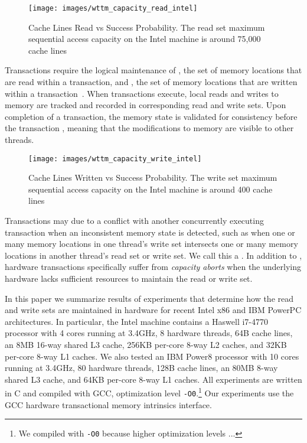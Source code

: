 \begin{figure}[H]%
\centering
\texttt{[image: images/wttm\_capacity\_read\_intel]}
\caption{Cache Lines Read vs Success Probability. The read set maximum sequential access capacity on the Intel machine is
around 75,000 cache lines}
\label{fig:wttm_capacity_read_intel}
\end{figure}



Transactions require the logical 
maintenance of , the set
of memory locations that are read within a 
transaction, and , the set
of memory locations that are written within 
a transaction~\cite{HerlihyMo93}. When transactions execute, 
local reads and writes to memory 
are tracked and recorded in
corresponding read and write sets. Upon 
completion of a transaction, the memory state is validated for 
consistency before the transaction
, meaning that the modifications to 
memory are visible to other threads.


\begin{figure}[H]%
\centering
\texttt{[image: images/wttm\_capacity\_write\_intel]}
\caption{Cache Lines Written vs Success Probability. 
The write set maximum sequential access capacity on the Intel machine is
around 400 cache lines}
\label{fig:wttm_capacity_write_intel}
\end{figure}

Transactions may  due to a conflict with
another concurrently executing transaction when an
inconsistent memory state is detected, 
such as when one or many memory locations
in one thread's write set intersects one or 
many memory locations in another
thread's read set or write set.  We call this a
.  In addition to ,
hardware transactions specifically suffer 
from \textit{capacity aborts} when the underlying hardware
lacks sufficient resources to maintain the
read or write set.


In this paper we summarize results of experiments 
that determine how the
read and write sets are maintained in hardware for recent 
Intel x86 and IBM PowerPC architectures. In particular,
the Intel machine contains a Haswell i7-4770 processor with 4
cores running at 3.4GHz, 8 hardware threads, 64B cache lines, an 8MB
16-way shared L3 cache, 256KB per-core 8-way L2 caches, 
and 32KB per-core 8-way L1 caches.
We also tested an IBM Power8 processor with 10 cores running at 3.4GHz,
80 hardware threads, 128B cache lines, an 80MB 8-way
shared L3 cache, and 64KB per-core 8-way L1 caches.
All experiments are written in C and compiled with GCC, 
optimization level
\texttt{-O0}.\footnote{We compiled with \texttt{-O0} because
higher optimization levels ...} Our experiments use the GCC hardware 
transactional memory intrinsics interface.

